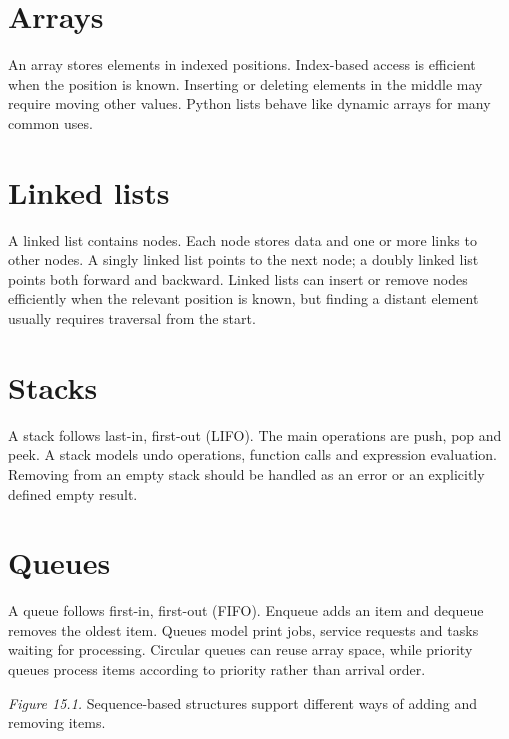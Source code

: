 \documentclass[11pt,openany,oneside]{book}
\begin{document}
\section{Arrays}
An array stores elements in indexed positions. Index-based access is efficient when the position is known. Inserting or deleting elements in the middle may require moving other values. Python lists behave like dynamic arrays for many common uses.

\section{Linked lists}
A linked list contains nodes. Each node stores data and one or more links to other nodes. A singly linked list points to the next node; a doubly linked list points both forward and backward. Linked lists can insert or remove nodes efficiently when the relevant position is known, but finding a distant element usually requires traversal from the start.

\section{Stacks}
A stack follows last-in, first-out (LIFO). The main operations are push, pop and peek. A stack models undo operations, function calls and expression evaluation. Removing from an empty stack should be handled as an error or an explicitly defined empty result.

\section{Queues}
A queue follows first-in, first-out (FIFO). Enqueue adds an item and dequeue removes the oldest item. Queues model print jobs, service requests and tasks waiting for processing. Circular queues can reuse array space, while priority queues process items according to priority rather than arrival order.

\begin{center}
\end{center}
\textit{Figure 15.1.} Sequence-based structures support different ways of adding and removing items.
\end{document}
